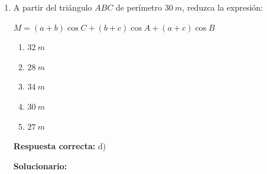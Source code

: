 \begin{enumerate}[resume]
	\vspace{2mm}
	\textbf{Solucionario:}
	
	Analicemos en la circunferencia unitaria:
	
	$\theta\in\left[\dfrac{7\pi}{6},\dfrac{11\pi}{6}\right]\ ;\ \left[\dfrac{7\pi}{6},\dfrac{11\pi}{6}\right]=[210^\circ,330^\circ]$
	
	$\cot 210^\circ=\cot 30^\circ=\sqrt{3}$
	
	$\cot 330^\circ=-\cot 30^\circ=-\sqrt{3}$
	
	$210^\circ\leq \theta\leq 330^\circ$
	
	$\cot 210^\circ\geq \cot\theta\geq \cot 330^\circ$
	
	$\sqrt{3}\geq \cot\theta\geq -\sqrt{3}$
	
	$\sqrt{3}\cdot\sqrt{3}\geq \sqrt{3}\cot\theta\geq -\sqrt{3}(\sqrt{3})$
	
	$3\geq \sqrt{3}\cot\theta\geq -3$
	
	$3+3\geq \sqrt{3}\cot\theta+3\geq -3+3$
	
	$6\geq M\geq 0$
	
	Suma:
	
	
	\vspace{6mm}
	
	\item A partir del triángulo $ABC$ de perímetro $30\ m$, reduzca la expresión:
	
	$M=(a+b)\cos C+(b+c)\cos A+(a+c)\cos B$
	
	\begin{enumerate}[label=\alph*)]
		\item $32\ m$
		\item $28\ m$
		\item $34\ m$
		\item $30\ m$
		\item $27\ m$
	\end{enumerate}
	\textbf{Respuesta correcta:} d)
	
	\vspace{2mm}
	\textbf{Solucionario:}
	
	
\end{enumerate}
